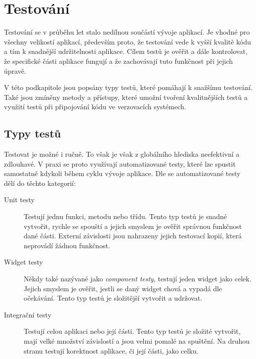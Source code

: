 \section{Testování}

Testování se v průběhu let stalo nedílnou součástí vývoje aplikací.
Je vhodné pro všechny velikostí aplikací,
především proto,
že testování vede k vyšší kvalitě kódu \cite{testing_quality}
a tím k snadnější udržitelnosti aplikace.
Cílem testů je ověřit a dále kontrolovat,
že specifické části aplikace fungují
a že zachovávají tuto funkčnost při jejich úpravě.

V této podkapitole jsou popsány typy testů,
které pomáhají k snažšímu testování.
Také jsou zmíněny metody a přístupy,
které umožní tvoření kvalitnějších testů
a využití testů při připojování kódu ve verzovacích systémech. 

\subsection{Typy testů}

Testovat je možné i ručně.
To však je však z globálního hlediska neefektivní a zdlouhavé.
V praxi se proto využívají automatizované testy,
které lze spustit samostatně kdykoli během cyklu vývoje aplikace.
Dle \cite{testing_flutter} se automatizované testy dělí do těchto kategorií:

\begin{description}
    \item[Unit testy] Testují jednu funkci, metodu nebo třídu.
    Tento typ testů je snadné vytvořit,
    rychle se spouští
    a jejich smyslem je ověřit správnou funkčnost dané části.
    Externí závislosti jsou nahrazeny jejich testovací kopií,
    která neprovádí žádnou funkčnost.
    \item[Widget testy] Někdy také nazývané jako \emph{component testy},
    testují jeden widget jako celek.
    Jejich smyslem je ověřit,
    jestli se daný widget chová a vypadá dle očekávání.
    Tento typ testů je složitější vytvořit a udržovat.
    \item[Integrační testy] Testují celou aplikaci nebo její části.
    Tento typ testů je složité vytvořit,
    mají velké množství závislostí a jsou velmi pomalé na spuštění.
    Na druhou stranu testují korektnost aplikace,
    či její části,
    jako celku.
\end{description}

